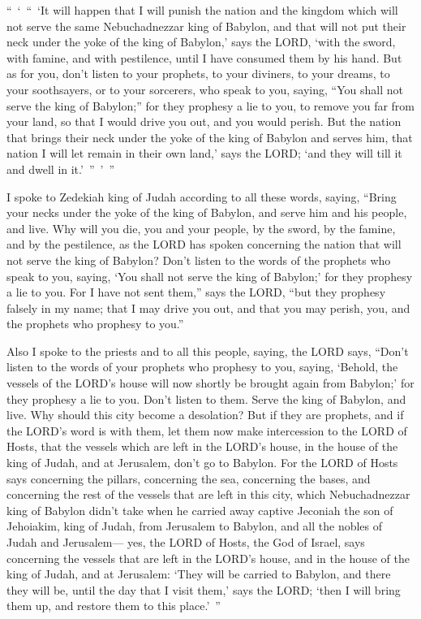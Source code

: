 \myverse{}“ ‘ “ ‘It will happen that I will punish the nation and the kingdom which will not serve the same Nebuchadnezzar king of Babylon, and that will not put their neck under the yoke of the king of Babylon,’ says the LORD, ‘with the sword, with famine, and with pestilence, until I have consumed them by his hand. \myverse{}But as for you, don’t listen to your prophets, to your diviners, to your dreams, to your soothsayers, or to your sorcerers, who speak to you, saying, “You shall not serve the king of Babylon;” \myverse{}for they prophesy a lie to you, to remove you far from your land, so that I would drive you out, and you would perish. \myverse{}But the nation that brings their neck under the yoke of the king of Babylon and serves him, that nation I will let remain in their own land,’ says the LORD; ‘and they will till it and dwell in it.’ ” ’ ”


\myverse{}I spoke to Zedekiah king of Judah according to all these words, saying, “Bring your necks under the yoke of the king of Babylon, and serve him and his people, and live. \myverse{}Why will you die, you and your people, by the sword, by the famine, and by the pestilence, as the LORD has spoken concerning the nation that will not serve the king of Babylon? \myverse{}Don’t listen to the words of the prophets who speak to you, saying, ‘You shall not serve the king of Babylon;’ for they prophesy a lie to you. \myverse{}For I have not sent them,” says the LORD, “but they prophesy falsely in my name; that I may drive you out, and that you may perish, you, and the prophets who prophesy to you.”


\myverse{}Also I spoke to the priests and to all this people, saying, the LORD says, “Don’t listen to the words of your prophets who prophesy to you, saying, ‘Behold, the vessels of the LORD’s house will now shortly be brought again from Babylon;’ for they prophesy a lie to you. \myverse{}Don’t listen to them. Serve the king of Babylon, and live. Why should this city become a desolation? \myverse{}But if they are prophets, and if the LORD’s word is with them, let them now make intercession to the LORD of Hosts, that the vessels which are left in the LORD’s house, in the house of the king of Judah, and at Jerusalem, don’t go to Babylon. \myverse{}For the LORD of Hosts says concerning the pillars, concerning the sea, concerning the bases, and concerning the rest of the vessels that are left in this city, \myverse{}which Nebuchadnezzar king of Babylon didn’t take when he carried away captive Jeconiah the son of Jehoiakim, king of Judah, from Jerusalem to Babylon, and all the nobles of Judah and Jerusalem— \myverse{}yes, the LORD of Hosts, the God of Israel, says concerning the vessels that are left in the LORD’s house, and in the house of the king of Judah, and at Jerusalem: \myverse{}‘They will be carried to Babylon, and there they will be, until the day that I visit them,’ says the LORD; ‘then I will bring them up, and restore them to this place.’ ”


